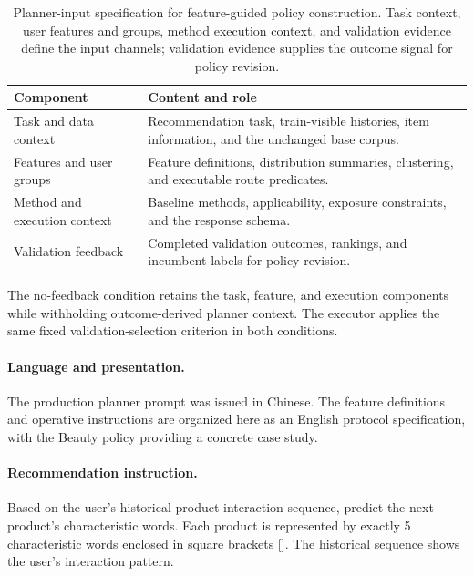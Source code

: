 \begin{table}[H]
\centering
\caption{Planner-input specification for feature-guided policy construction. Task context, user features and groups, method execution context, and validation evidence define the input channels; validation evidence supplies the outcome signal for policy revision.}
\label{tab:prompt-records}
\small
\renewcommand{\arraystretch}{1.14}
\setlength{\tabcolsep}{4pt}
\begin{tabular}{p{}p{}}
\toprule
Component & Content and role \\
\midrule
Task and data context & Recommendation task, train-visible histories, item information, and the unchanged base corpus. \\
Features and user groups & Feature definitions, distribution summaries, clustering, and executable route predicates. \\
Method and execution context & Baseline methods, applicability, exposure constraints, and the response schema. \\
Validation feedback & Completed validation outcomes, rankings, and incumbent labels for policy revision. \\
\bottomrule
\end{tabular}
\end{table}

\noindent The no-feedback condition retains the task, feature, and execution components while withholding outcome-derived planner context. The executor applies the same fixed validation-selection criterion in both conditions.

\paragraph{Language and presentation.}
The production planner prompt was issued in Chinese. The feature definitions and operative instructions are organized here as an English protocol specification, with the Beauty policy providing a concrete case study.

\paragraph{Recommendation instruction.}
\begingroup\footnotesize
\begin{promptblock}
Based on the user's historical product interaction sequence,
predict the next product's characteristic words.
Each product is represented by exactly 5 characteristic words
enclosed in square brackets []. The historical sequence shows
the user's interaction pattern.
\end{promptblock}
\endgroup

